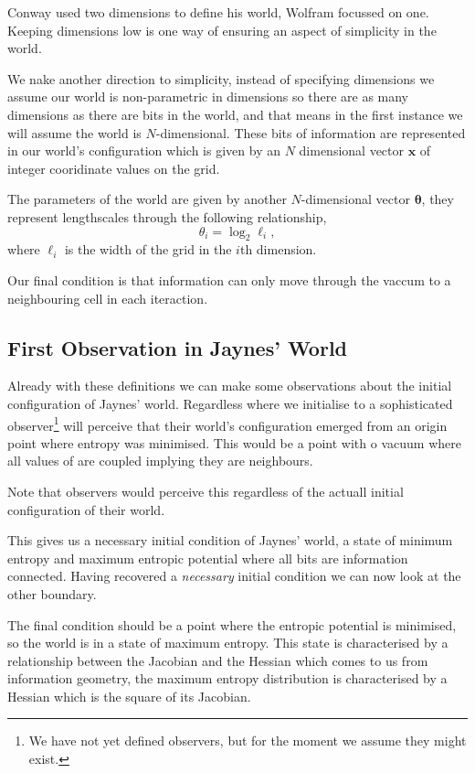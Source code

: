 \documentclass[11pt,a4paper]{article}
\begin{document}
Conway used two dimensions to define his world, Wolfram focussed on one. Keeping dimensions low is one way of ensuring an aspect of simplicity in the world.

We nake another direction to simplicity, instead of specifying dimensions we assume our world is non-parametric in dimensions so there are as many dimensions as there are bits in the world, and that means in the first instance we will assume the world is $N$-dimensional. These bits of information are represented in our world's configuration which is given by an $N$ dimensional vector $\mathbf{x}$ of integer cooridinate values on the grid.

The parameters of the world are given by another $N$-dimensional vector $\boldsymbol{\theta}$, they represent lengthscales through the following relationship,
\[
\theta_i = \log_2 \ell_i,
\]
where $\ell_i$ is the width of the grid in the $i$th dimension. 

Our final condition is that information can only move through the vaccum to a neighbouring cell in each iteraction. 

\subsection{First Observation in Jaynes' World}

Already with these definitions we can make some observations about the initial configuration of Jaynes' world. Regardless where we initialise to a sophisticated observer\footnote{We have not yet defined observers, but for the moment we assume they might exist.} will perceive that their world's configuration emerged from an origin point where entropy was minimised. This would be a point with o vacuum where all values of  are coupled implying they are neighbours. 

Note that observers would perceive this regardless of the actuall initial configuration of their world. 

This gives us a necessary initial condition of Jaynes' world, a state of minimum entropy and maximum entropic potential where all bits are information connected. Having recovered a \emph{necessary} initial condition we can now look at the other boundary.

The final condition should be a point where the entropic potential is minimised, so the world is in a state of maximum entropy. This state is characterised by a relationship between the Jacobian and the Hessian which comes to us from information geometry, the maximum entropy distribution is characterised by a Hessian which is the square of its Jacobian. 
\end{document}
